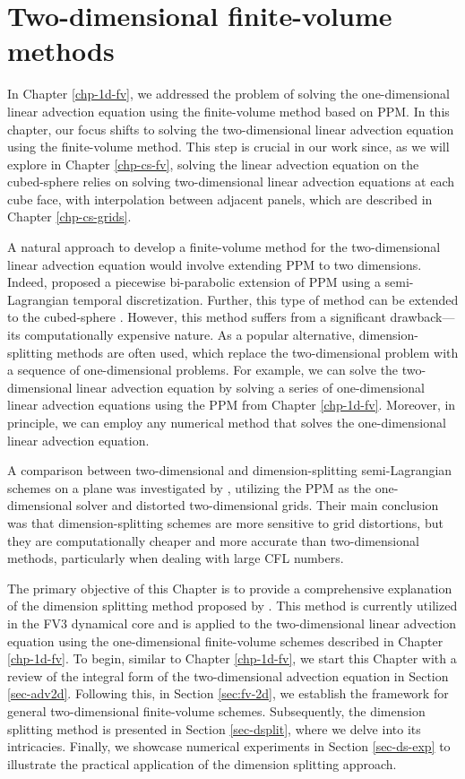 \chapter{Two-dimensional finite-volume methods}
\label{chp-2d-fv}
In Chapter \ref{chp-1d-fv}, we addressed the problem of solving the one-dimensional linear advection 
equation using the finite-volume method based on PPM.
In this chapter, our focus shifts to solving the two-dimensional linear advection equation using the finite-volume method.
This step is crucial in our work since, as we will explore in Chapter \ref{chp-cs-fv},
solving the linear advection equation on the cubed-sphere relies on solving two-dimensional linear advection equations at each cube face,
with interpolation between adjacent panels, which are described in Chapter \ref{chp-cs-grids}.

A natural approach to develop a finite-volume method for the two-dimensional linear advection equation would involve extending PPM to two dimensions.
Indeed, \citet{rancic:1992} proposed a piecewise bi-parabolic extension of PPM using a semi-Lagrangian temporal discretization.
Further, this type of method can be extended to the cubed-sphere \citep{lauritzen:2010}.
However, this method suffers from a significant drawback—its computationally expensive nature.
As a popular alternative, dimension-splitting methods are often used, which replace the two-dimensional problem with a sequence of one-dimensional problems.
For example, we can solve the two-dimensional linear advection equation by solving a series of one-dimensional linear advection equations
using the PPM from Chapter \ref{chp-1d-fv}. Moreover, in principle, we can employ any numerical method that solves the one-dimensional linear advection equation.

A comparison between two-dimensional and dimension-splitting semi-Lagrangian schemes on a plane was investigated by \citet{chen:2017},
utilizing the PPM as the one-dimensional solver and distorted two-dimensional grids.
Their main conclusion was that dimension-splitting schemes are more sensitive to grid distortions, but they are computationally
cheaper and more accurate than two-dimensional methods, particularly when dealing with large CFL numbers.

The primary objective of this Chapter is to provide a comprehensive explanation of the dimension splitting method proposed by \citet{lin:1996}.
This method is currently utilized in the FV3 dynamical core and is applied to the two-dimensional linear advection equation using the one-dimensional
finite-volume schemes described in Chapter \ref{chp-1d-fv}.
To begin, similar to Chapter \ref{chp-1d-fv}, we start this Chapter with a review of the integral form of the two-dimensional
advection equation in Section \ref{sec-adv2d}. Following this, in Section \ref{sec:fv-2d}, we establish the framework for general two-dimensional finite-volume schemes.
Subsequently, the dimension splitting method is presented in Section \ref{sec-dsplit}, where we delve into its intricacies.
Finally, we showcase numerical experiments in Section \ref{sec-ds-exp} to illustrate the practical application of the dimension splitting approach.

